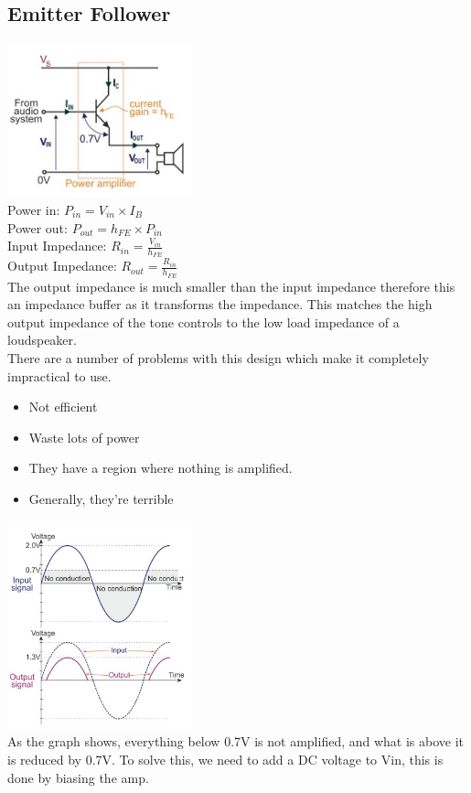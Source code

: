 \documentclass[a4paper, 11pt, twocolumn]{article}
\begin{document}
    \subsection{Emitter Follower}
    \includegraphics[width=0.4\textwidth]{emmitterFollower.jpg} \\
    Power in: $P_{in} = V_{in} \times I_B$\\
    Power out: $P_{out} = h_{FE} \times P_{in}$ \\
    Input Impedance: $\displaystyle R_{in} = \frac{V_{in}}{h_{FE}}$ \\
    Output Impedance: $\displaystyle R_{out} = \frac{R_{in}}{h_{FE}}$ \\
    The output impedance is much smaller than the input impedance therefore this an impedance buffer as it transforms the impedance. This matches the high output impedance of the tone controls to the low load impedance of a loudspeaker. \\
    There are a number of problems with this design which make it completely impractical to use.
    \begin{itemize}
        \item Not efficient
        \item Waste lots of power
        \item They have a region where nothing is amplified.
        \item Generally, they're terrible
    \end{itemize}
    \includegraphics[width=0.4\textwidth]{issueWithEF.jpg}\\
    As the graph shows, everything below 0.7V is not amplified, and what is above it is reduced by 0.7V. To solve this, we need to add a DC voltage to Vin, this is done by biasing the amp.
\end{document}
